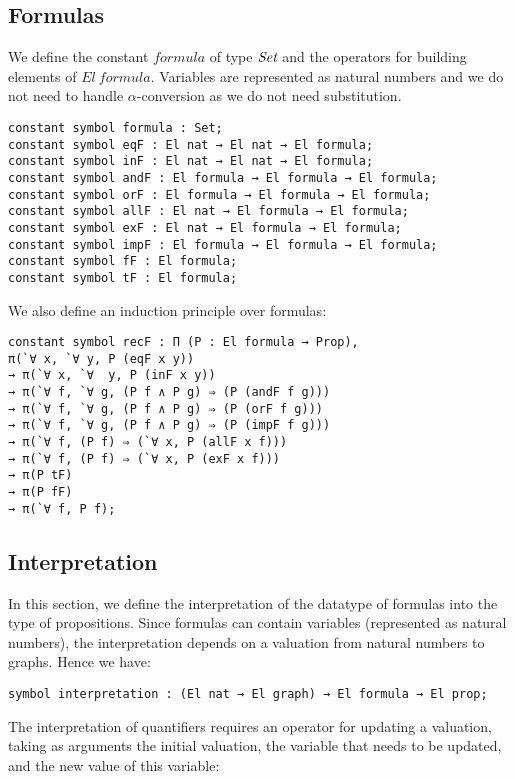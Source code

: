 \documentclass[submission,copyright,creativecommons]{eptcs}
\def\Set{\mbox{\it Set}}
\begin{document}
\subsection{Formulas}

We define the constant $formula$ of type $\Set$ and the operators for building elements of $El~formula$. Variables are represented as natural numbers and we do not need to handle $\alpha$-conversion as we do not need substitution.

\begin{lstlisting}
constant symbol formula : Set;
constant symbol eqF : El nat → El nat → El formula;
constant symbol inF : El nat → El nat → El formula;
constant symbol andF : El formula → El formula → El formula;
constant symbol orF : El formula → El formula → El formula;
constant symbol allF : El nat → El formula → El formula;
constant symbol exF : El nat → El formula → El formula;
constant symbol impF : El formula → El formula → El formula;
constant symbol fF : El formula;
constant symbol tF : El formula;
\end{lstlisting}

We also define an induction principle over formulas:

\begin{lstlisting}
constant symbol recF : Π (P : El formula → Prop), 
π(`∀ x, `∀ y, P (eqF x y))
→ π(`∀ x, `∀  y, P (inF x y))
→ π(`∀ f, `∀ g, (P f ∧ P g) ⇒ (P (andF f g)))
→ π(`∀ f, `∀ g, (P f ∧ P g) ⇒ (P (orF f g)))
→ π(`∀ f, `∀ g, (P f ∧ P g) ⇒ (P (impF f g)))
→ π(`∀ f, (P f) ⇒ (`∀ x, P (allF x f)))
→ π(`∀ f, (P f) ⇒ (`∀ x, P (exF x f)))
→ π(P tF)
→ π(P fF)
→ π(`∀ f, P f);
\end{lstlisting}

\subsection{Interpretation}

In this section, we define the interpretation of the datatype of formulas into the type of propositions. Since formulas can contain variables (represented as natural numbers), the interpretation depends on a valuation from natural numbers to graphs. Hence we have:

\begin{lstlisting}
symbol interpretation : (El nat → El graph) → El formula → El prop;
\end{lstlisting} 

The interpretation of quantifiers requires an operator for updating a valuation, taking as arguments the initial valuation, the variable that needs to be updated, and the new value of this variable:
\end{document}
